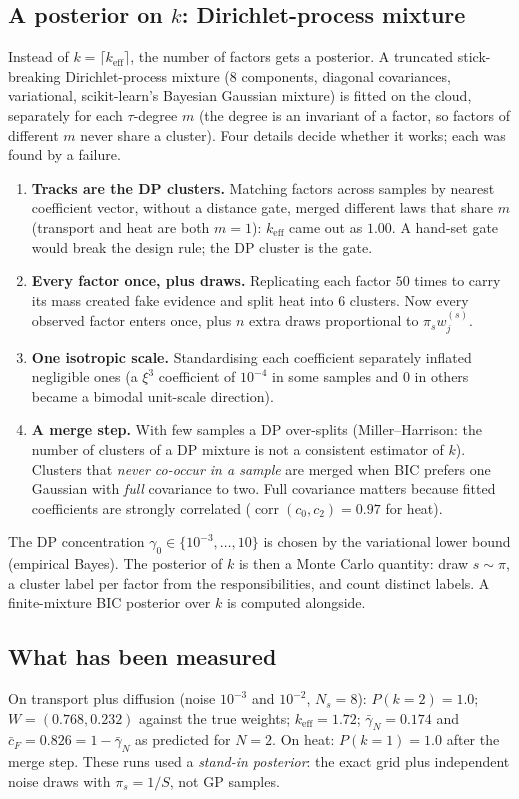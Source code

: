 \subsection{A posterior on $k$: Dirichlet-process mixture}
Instead of $k=\lceil k_{\mathrm{eff}}\rceil$, the number of factors gets a posterior. A truncated stick-breaking Dirichlet-process mixture ($8$ components, diagonal covariances, variational, scikit-learn's Bayesian Gaussian mixture) is fitted on the cloud, separately for each $\tau$-degree $m$ (the degree is an invariant of a factor, so factors of different $m$ never share a cluster). Four details decide whether it works; each was found by a failure.
\begin{enumerate}[nosep]
\item \textbf{Tracks are the DP clusters.} Matching factors across samples by nearest coefficient vector, without a distance gate, merged different laws that share $m$ (transport and heat are both $m=1$): $k_{\mathrm{eff}}$ came out as $1.00$. A hand-set gate would break the design rule; the DP cluster is the gate.
\item \textbf{Every factor once, plus draws.} Replicating each factor $50$ times to carry its mass created fake evidence and split heat into 6 clusters. Now every observed factor enters once, plus $n$ extra draws proportional to $\pi_sw^{(s)}_j$.
\item \textbf{One isotropic scale.} Standardising each coefficient separately inflated negligible ones (a $\xi^3$ coefficient of $10^{-4}$ in some samples and $0$ in others became a bimodal unit-scale direction).
\item \textbf{A merge step.} With few samples a DP over-splits (Miller--Harrison: the number of clusters of a DP mixture is not a consistent estimator of $k$). Clusters that \emph{never co-occur in a sample} are merged when BIC prefers one Gaussian with \emph{full} covariance to two. Full covariance matters because fitted coefficients are strongly correlated ($\operatorname{corr}(c_0,c_2)=0.97$ for heat).
\end{enumerate}
The DP concentration $\gamma_0\in\{10^{-3},\dots,10\}$ is chosen by the variational lower bound (empirical Bayes). The posterior of $k$ is then a Monte Carlo quantity: draw $s\sim\pi$, a cluster label per factor from the responsibilities, and count distinct labels. A finite-mixture BIC posterior over $k$ is computed alongside.

\subsection{What has been measured}
On transport plus diffusion (noise $10^{-3}$ and $10^{-2}$, $N_s=8$): $P(k=2)=1.0$; $W=(0.768,0.232)$ against the true weights; $k_{\mathrm{eff}}=1.72$; $\bar\gamma_N=0.174$ and $\bar c_F=0.826=1-\bar\gamma_N$ as predicted for $N=2$. On heat: $P(k=1)=1.0$ after the merge step. These runs used a \emph{stand-in posterior}: the exact grid plus independent noise draws with $\pi_s=1/S$, not GP samples.

